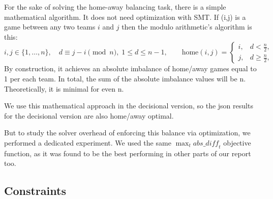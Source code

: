 For the sake of solving the home-away balancing task, there is a simple mathematical algorithm. It does not need optimization with SMT.
If (i,j) is a game between any two teams $i$ and $j$ then the modulo arithmetic's algorithm is this:
\[
i,j\in\{1,\dots,n\},\quad
d\equiv j-i\pmod n,\;1\le d\le n-1,
\qquad
\text{home}(i,j)=
\begin{cases}
i,&d<\tfrac n2,\\
j,&d\ge\tfrac n2,
\end{cases}
\]
By construction, it achieves an absolute imbalance of home/away games equal to 1 per each team. In total, the sum of the absolute imbalance values will be n.
Theoretically, it is minimal for even n.

We use this mathematical approach in the decisional version, so the json results for the decisional version are also home/away optimal.

But to study the solver overhead of enforcing this balance via optimization, we performed a dedicated experiment. 
We used the same $\max_{t}\mathit{abs\_diff}_t$ objective function, as it was found to be the best performing in other parts of our report too.





\subsection{Constraints}

